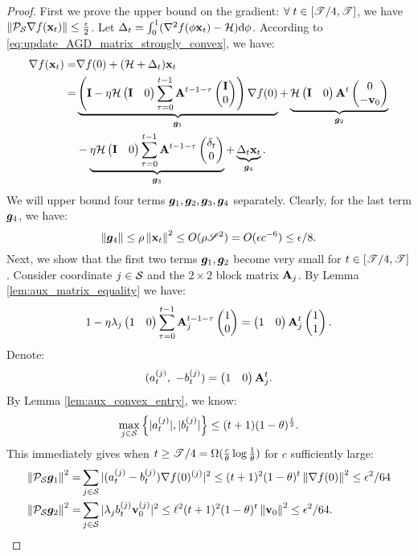 \begin{proof}
First we prove the upper bound on the gradient: $\forall \; t\in [\utime/4, \utime]$, we have $\norm{\proj_\S\grad f(\x_{t})} \le \frac{\epsilon}{2}$. 
Let $\Delta_t = \int_{0}^1 (\hess f(\phi \x_t) - \H)\mathrm{d}\phi$. According to \eqref{eq:update_AGD_matrix_strongly_convex}, we have:
\begin{align*}
\grad f(\x_t) = &
\grad f(0) + (\H + \Delta_t)\x_t \\
=& \underbrace{\left(\I - \eta\H \pmat{\I & 0}\sum_{\tau = 0}^{t-1} \A^{t-1-\tau}\pmat{\I \\ 0}\right) \grad f(0)}_{\g_1}
+ \underbrace{\H \pmat{\I & 0}\A^t\pmat{0 \\ -\v_0}}_{\g_2} \\
&- \underbrace{\eta\H \pmat{\I & 0}\sum_{\tau = 0}^{t-1} \A^{t-1-\tau}\pmat{\delta_t \\ 0}}_{\g_3}
+ \underbrace{\Delta_t \x_t}_{\g_4}.
\end{align*}
We will upper bound four terms $\g_1, \g_2, \g_3, \g_4$ separately. 
Clearly, for the last term $\g_4$, we have:
$$\norm{\g_4} \le \rho\norm{\x_t}^2 \le O(\rho \uspace^2) = O(\epsilon c^{-6}) \le \epsilon/8.$$
Next, we show that the first two terms $\g_1, \g_2$ become very small for $t\in [\utime/4, \utime]$.
Consider coordinate $j \in \S$ and the $2\times 2$ block matrix $\A_j$.  By Lemma \ref{lem:aux_matrix_equality} we have:
\begin{align*}
1 - \eta\lambda_j \pmat{1 & 0}\sum_{\tau = 0}^{t-1} \A_j^{t-1-\tau}\pmat{1 \\ 0}
 = \pmat{1 & 0}  \A_j^t \pmat{1 \\ 1}.
\end{align*}
Denote:
\begin{equation*}
(a^{(j)}_{t}, ~-b^{(j)}_t) =\pmat{1 & 0 }\A_j^{t}.
\end{equation*}
By Lemma \ref{lem:aux_convex_entry}, we know:
\begin{equation*}
\max_{j\in \S} \left\{ |a^{(j)}_t|
, |b^{(j)}_t| \right\} \le (t+1) (1-\theta)^{\frac{t}{2}} .
\end{equation*}
This immediately gives when $t\ge \utime/4 = \Omega(\frac{c}{\theta}\log\frac{1}{\theta})$ for $c$ sufficiently large:
\begin{align*}
\norm{\proj_\S \g_1}^2 =& \sum_{j\in \S} |(a^{(j)}_{t} - b^{(j)}_t) \grad f(0)^{(j)}|^2
\le (t+1)^2(1-\theta)^t \norm{\grad f(0)}^2 \le \epsilon^2/64 \\
\norm{\proj_\S \g_2}^2 = & \sum_{j\in \S} |\lambda_j  b^{(j)}_t \v_0^{(j)}|^2
\le \ell^2 (t+1)^2 (1-\theta)^t \norm{\v_0}^2 \le \epsilon^2/64.

\end{align*}
\end{proof}
